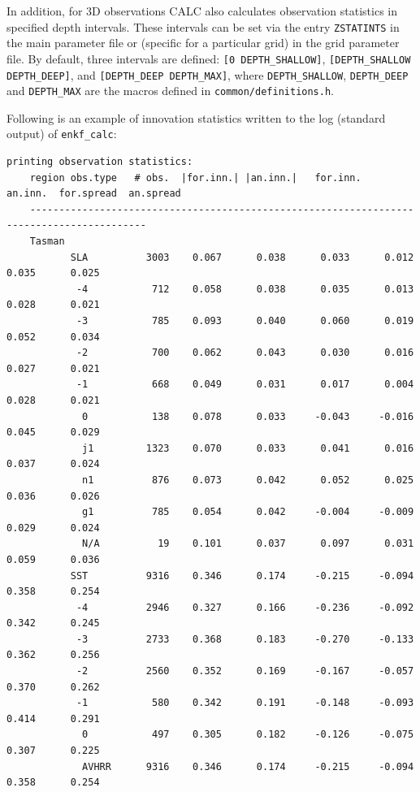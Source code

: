 \documentclass[11pt]{report}
\begin{document}
In addition, for 3D observations CALC also calculates observation statistics in specified depth intervals.
These intervals can be set via the entry \verb|ZSTATINTS| in the main parameter file or (specific for a particular grid) in the grid parameter file.
By default, three intervals are defined: \verb|[0 DEPTH_SHALLOW]|, \verb|[DEPTH_SHALLOW DEPTH_DEEP]|, and \verb|[DEPTH_DEEP DEPTH_MAX]|, where \verb|DEPTH_SHALLOW|, \verb|DEPTH_DEEP| and \verb|DEPTH_MAX| are the macros defined in \verb|common/definitions.h|.

Following is an example of innovation statistics written to the log (standard output) of \verb|enkf_calc|:
\begin{Verbatim}[frame=single,fontsize=\footnotesize]
  printing observation statistics:
    region obs.type   # obs.  |for.inn.| |an.inn.|   for.inn.   an.inn.  for.spread  an.spread
    ------------------------------------------------------------------------------------------
    Tasman
           SLA          3003    0.067      0.038      0.033      0.012      0.035      0.025  
            -4           712    0.058      0.038      0.035      0.013      0.028      0.021  
            -3           785    0.093      0.040      0.060      0.019      0.052      0.034  
            -2           700    0.062      0.043      0.030      0.016      0.027      0.021  
            -1           668    0.049      0.031      0.017      0.004      0.028      0.021  
             0           138    0.078      0.033     -0.043     -0.016      0.045      0.029  
             j1         1323    0.070      0.033      0.041      0.016      0.037      0.024  
             n1          876    0.073      0.042      0.052      0.025      0.036      0.026  
             g1          785    0.054      0.042     -0.004     -0.009      0.029      0.024  
             N/A          19    0.101      0.037      0.097      0.031      0.059      0.036  
           SST          9316    0.346      0.174     -0.215     -0.094      0.358      0.254  
            -4          2946    0.327      0.166     -0.236     -0.092      0.342      0.245  
            -3          2733    0.368      0.183     -0.270     -0.133      0.362      0.256  
            -2          2560    0.352      0.169     -0.167     -0.057      0.370      0.262  
            -1           580    0.342      0.191     -0.148     -0.093      0.414      0.291  
             0           497    0.305      0.182     -0.126     -0.075      0.307      0.225  
             AVHRR      9316    0.346      0.174     -0.215     -0.094      0.358      0.254  

\end{Verbatim}
\end{document}
